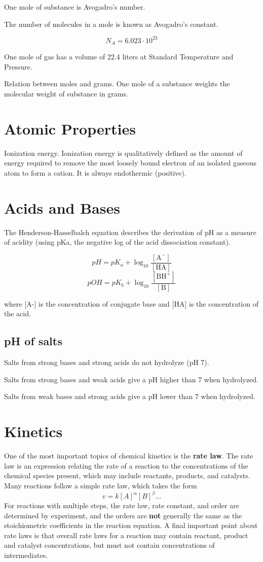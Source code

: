 \documentclass[oneside]{book}
\begin{document}
One mole of substance is Avogadro's number.

The number of molecules in a mole is known as Avogadro's constant.

\[N_A = 6.023 \cdot 10^{23}\]

One mole of gas has a volume of 22.4 liters at Standard Temperature and
Pressure.

Relation between moles and grams.
One mole of a substance weights the molecular weight of substance in grams.

\chapter{Atomic Properties}

Ionization energy. Ionization energy is qualitatively defined as the amount of
energy required to remove the most loosely bound electron of an isolated
gaseous atom to form a cation. It is always endothermic (positive).

\chapter{Acids and Bases}

The Henderson-Hasselbalch equation describes the derivation of pH as a
measure of acidity (using pKa, the negative log of the acid dissociation
constant).

\[pH = pK_a + \log_{10} \frac{[\text{A}^-]}{[\text{HA}]}\]
\[pOH = pK_b + \log_{10} \frac{[\text{BH}^+]}{[\text{B}]}\]

where [A-] is the concentration of conjugate base and [HA] is the concentration
of the acid.

\section{pH of salts}
Salts from strong bases and strong acids do not hydrolyze (pH 7).

Salts from strong bases and weak acids give a pH higher than 7 when hydrolyzed.

Salts from weak bases and strong acids give a pH lower than 7 when hydrolyzed.

\chapter{Kinetics}

One of the most important topics of chemical kinetics is the \textbf{rate law}.
The rate law is an expression relating the rate of a reaction to the
concentrations of the chemical species present, which may include reactants,
products, and catalysts. Many reactions follow a simple rate law, which takes
the form
\[v = k [A]^\alpha [B]^\beta \ldots\]
For reactions with multiple steps, the rate law, rate constant, and order are
determined by experiment, and the orders are \textbf{not} generally the same as
the stoichiometric coefficients in the reaction equation.  A final important
point about rate laws is that overall rate laws for a reaction may contain
reactant, product and catalyst concentrations, but must not contain
concentrations of intermediates.
\end{document}
